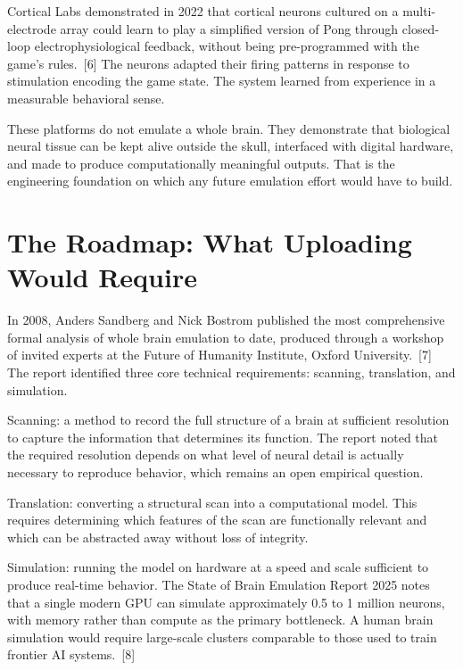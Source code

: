 \documentclass[11pt,a4paper]{article}
\begin{document}
Cortical Labs demonstrated in 2022 that cortical neurons cultured on a multi-electrode array could learn to play a simplified version of Pong through closed-loop electrophysiological feedback, without being pre-programmed with the game's rules.~[6] The neurons adapted their firing patterns in response to stimulation encoding the game state. The system learned from experience in a measurable behavioral sense.

These platforms do not emulate a whole brain. They demonstrate that biological neural tissue can be kept alive outside the skull, interfaced with digital hardware, and made to produce computationally meaningful outputs. That is the engineering foundation on which any future emulation effort would have to build.

\section{The Roadmap: What Uploading Would Require}

In 2008, Anders Sandberg and Nick Bostrom published the most comprehensive formal analysis of whole brain emulation to date, produced through a workshop of invited experts at the Future of Humanity Institute, Oxford University.~[7] The report identified three core technical requirements: scanning, translation, and simulation.

Scanning: a method to record the full structure of a brain at sufficient resolution to capture the information that determines its function. The report noted that the required resolution depends on what level of neural detail is actually necessary to reproduce behavior, which remains an open empirical question.

Translation: converting a structural scan into a computational model. This requires determining which features of the scan are functionally relevant and which can be abstracted away without loss of integrity.

Simulation: running the model on hardware at a speed and scale sufficient to produce real-time behavior. The State of Brain Emulation Report 2025 notes that a single modern GPU can simulate approximately 0.5 to 1 million neurons, with memory rather than compute as the primary bottleneck. A human brain simulation would require large-scale clusters comparable to those used to train frontier AI systems.~[8]
\end{document}
